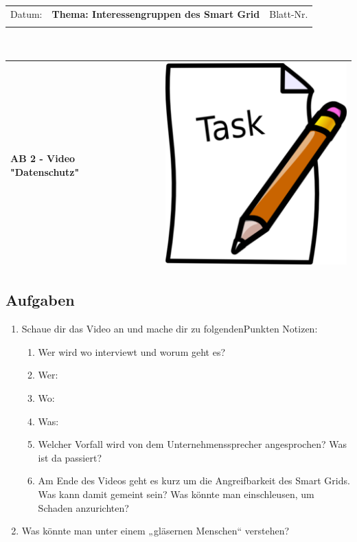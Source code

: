 \documentclass[11pt,a4paper,DIV=10,BCOR=0mm]{scrartcl}
\begin{document}
%
\setlength{\tabcolsep}{3mm} %
\noindent
\begin{tabularx}{\textwidth}{|l|T|l|}
\hline
Datum: & \rule{0pt}{5mm} \textbf{\textsf{Thema: Interessengruppen des Smart Grid}} & Blatt-Nr. \\
&&\\ 
\hline
\end{tabularx}
\rule{0pt}{3mm} \\
\setlength{\tabcolsep}{0mm} %
\begin{tabularx}{\linewidth}{lXr}
{\Large\textsf{\textbf{AB 2 - Video "Datenschutz"}}} & &
\includegraphics[scale=0.25]{images/task}\\  %
\hline
\end{tabularx}
%
\subsection*{Aufgaben}
\begin{enumerate}
\item Schaue dir das Video an und mache dir zu folgendenPunkten Notizen:
\begin{enumerate}
\item Wer wird wo interviewt und worum geht es?
\item[] Wer:\vspace{1.2cm}
\item[] Wo:\vspace{1.2cm}
\item[] Was:\vspace{1.2cm}
\item Welcher Vorfall wird von dem Unternehmenssprecher angesprochen? Was ist da passiert?
\vspace{3cm}
\item Am Ende des Videos geht es kurz um die Angreifbarkeit des Smart Grids. Was
kann damit gemeint sein? Was könnte man einschleusen, um Schaden
anzurichten? \vspace{2cm}
\end{enumerate}
\item Was könnte man unter einem „gläsernen Menschen“ verstehen?
\end{enumerate}
\end{document}
